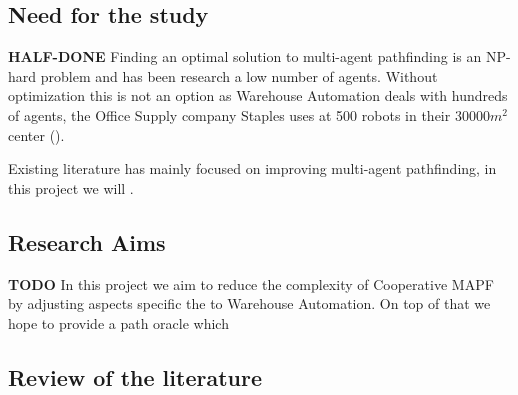 \documentclass[a4paper,11pt]{article}
\begin{document}
\subsection{Need for the study}


\textbf{HALF-DONE} Finding an optimal solution to multi-agent pathfinding is an NP-hard problem and has been research a low number of agents. Without optimization this is not an option as Warehouse Automation deals with hundreds of agents, the Office Supply company Staples uses at 500 robots in their 30000$m^{2}$ center (\cite{guizzo2008three}).

Existing literature has mainly focused on improving multi-agent pathfinding, in this project we will .









\subsection{Research Aims}
\textbf{TODO} In this project we aim to reduce the complexity of Cooperative MAPF by adjusting aspects specific the to Warehouse Automation. On top of that we hope to provide a path oracle which 

\subsection{Review of the literature}
\end{document}
